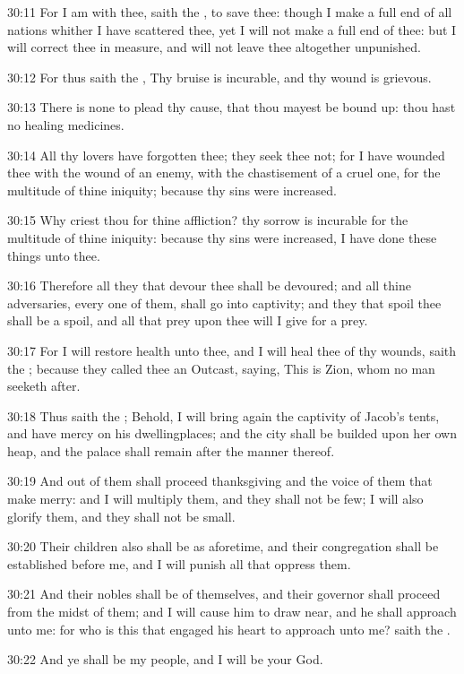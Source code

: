 30:11 For I am with thee, saith the \LORD, to save thee: though I make
a full end of all nations whither I have scattered thee, yet I will
not make a full end of thee: but I will correct thee in measure, and
will not leave thee altogether unpunished.

30:12 For thus saith the \LORD, Thy bruise is incurable, and thy wound
is grievous.

30:13 There is none to plead thy cause, that thou mayest be bound up:
thou hast no healing medicines.

30:14 All thy lovers have forgotten thee; they seek thee not; for I
have wounded thee with the wound of an enemy, with the chastisement of
a cruel one, for the multitude of thine iniquity; because thy sins
were increased.

30:15 Why criest thou for thine affliction? thy sorrow is incurable
for the multitude of thine iniquity: because thy sins were increased,
I have done these things unto thee.

30:16 Therefore all they that devour thee shall be devoured; and all
thine adversaries, every one of them, shall go into captivity; and
they that spoil thee shall be a spoil, and all that prey upon thee
will I give for a prey.

30:17 For I will restore health unto thee, and I will heal thee of thy
wounds, saith the \LORD; because they called thee an Outcast, saying,
This is Zion, whom no man seeketh after.

30:18 Thus saith the \LORD; Behold, I will bring again the captivity of
Jacob's tents, and have mercy on his dwellingplaces; and the city
shall be builded upon her own heap, and the palace shall remain after
the manner thereof.

30:19 And out of them shall proceed thanksgiving and the voice of them
that make merry: and I will multiply them, and they shall not be few;
I will also glorify them, and they shall not be small.

30:20 Their children also shall be as aforetime, and their
congregation shall be established before me, and I will punish all
that oppress them.

30:21 And their nobles shall be of themselves, and their governor
shall proceed from the midst of them; and I will cause him to draw
near, and he shall approach unto me: for who is this that engaged his
heart to approach unto me? saith the \LORD.

30:22 And ye shall be my people, and I will be your God.

